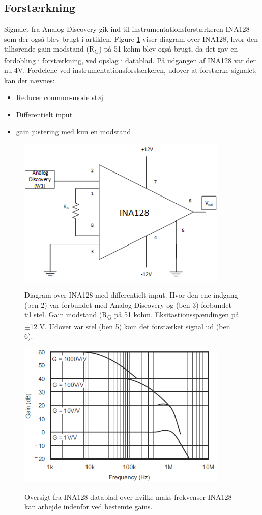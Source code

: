 \subsection{Forstærkning}
Signalet fra Analog Discovery gik ind til instrumentationsforstærkeren INA128 som der også blev brugt i artiklen. Figure \ref{fig:ina128} viser diagram over INA128, hvor den tilhørende gain modstand (R\textsubscript{G}) på 51 kohm blev også brugt, da det gav en fordobling i forstærkning, ved opslag i datablad. På udgangen af INA128 var der nu 4V. Fordelene ved instrumentationsforstærkeren, udover at forstærke signalet, kan der nævnes\cite{PeterJohansen2014}:

\begin{itemize}
\item Reducer common-mode støj
\item Differentielt input
\item gain justering med kun en modstand
\end{itemize}


\begin{figure}[H]
\centering
{\includegraphics[width=10cm]
{Figure/ina128}}
\caption{Diagram over INA128 med differentielt input. Hvor den ene indgang (ben 2) var forbundet med Analog Discovery og (ben 3) forbundet til stel. Gain modstand (R\textsubscript{G} på 51 kohm. Eksitastionsspændingen på $\pm$12 V. Udover var stel (ben 5) kom det forstærket signal ud (ben 6).  }
\label{fig:ina128}
\end{figure}


\begin{figure}[H]
\centering
{\includegraphics[width=10cm]
{Figure/ina128gain}}
\caption{Oversigt fra INA128 datablad over hvilke maks frekvenser INA128 kan arbejde indenfor ved bestemte gains.}
\label{fig:ina128gain}
\end{figure}


